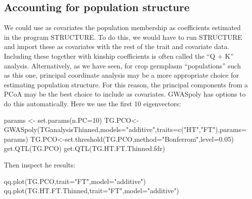 \documentclass[
]{book}
\newenvironment{Shaded}{\begin{snugshade}}{\end{snugshade}}
\newcommand{\AttributeTok}[1]{\textcolor[rgb]{0.77,0.63,0.00}{#1}}
\newcommand{\DecValTok}[1]{\textcolor[rgb]{0.00,0.00,0.81}{#1}}
\newcommand{\FloatTok}[1]{\textcolor[rgb]{0.00,0.00,0.81}{#1}}
\newcommand{\FunctionTok}[1]{\textcolor[rgb]{0.00,0.00,0.00}{#1}}
\newcommand{\NormalTok}[1]{#1}
\newcommand{\OtherTok}[1]{\textcolor[rgb]{0.56,0.35,0.01}{#1}}
\newcommand{\StringTok}[1]{\textcolor[rgb]{0.31,0.60,0.02}{#1}}
\begin{document}
\hypertarget{accounting-for-population-structure}{%
\subsection{Accounting for population structure}\label{accounting-for-population-structure}}

We could use as covariates the population membership as coefficients estimated in the program STRUCTURE. To do this, we would have to run STRUCTURE and import these as covariates with the rest of the trait and covariate data. Including these together with kinship coefficients is often called the ``Q + K'' analysis. Alternatively, as we have seen, for crop germplasm ``populations'' such as this one, principal coordinate analysis may be a more appropriate choice for estimating population structure. For this reason, the principal components from a PCoA may be the best choice to include as covariates. GWASpoly has options to do this automatically. Here we use the first 10 eigenvectors:

\begin{Shaded}
\begin{Highlighting}[]
\NormalTok{params }\OtherTok{\textless{}{-}} \FunctionTok{set.params}\NormalTok{(}\AttributeTok{n.PC=}\DecValTok{10}\NormalTok{) }
\NormalTok{TG.PCO}\OtherTok{\textless{}{-}}\FunctionTok{GWASpoly}\NormalTok{(TGanalysisThinned,}\AttributeTok{models=}\StringTok{"additive"}\NormalTok{,}\AttributeTok{traits=}\FunctionTok{c}\NormalTok{(}\StringTok{"HT"}\NormalTok{,}\StringTok{"FT"}\NormalTok{),}\AttributeTok{params=}\NormalTok{params)}
\NormalTok{TG.PCO}\OtherTok{\textless{}{-}}\FunctionTok{set.threshold}\NormalTok{(TG.PCO,}\AttributeTok{method=}\StringTok{"Bonferroni"}\NormalTok{,}\AttributeTok{level=}\FloatTok{0.05}\NormalTok{)}
\FunctionTok{get.QTL}\NormalTok{(TG.PCO)}
\FunctionTok{get.QTL}\NormalTok{(TG.HT.FT.Thinned.fdr)}
\end{Highlighting}
\end{Shaded}

Then inspect he results:

\begin{Shaded}
\begin{Highlighting}[]
\FunctionTok{qq.plot}\NormalTok{(TG.PCO,}\AttributeTok{trait=}\StringTok{"FT"}\NormalTok{,}\AttributeTok{model=}\StringTok{"additive"}\NormalTok{)}
\FunctionTok{qq.plot}\NormalTok{(TG.HT.FT.Thinned,}\AttributeTok{trait=}\StringTok{"FT"}\NormalTok{,}\AttributeTok{model=}\StringTok{"additive"}\NormalTok{)}
\end{Highlighting}
\end{Shaded}
\end{document}
